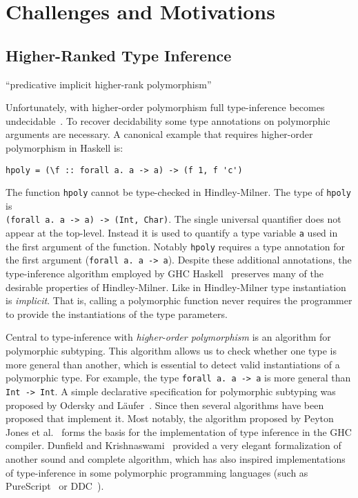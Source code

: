 \section{Challenges and Motivations}

\subsection{Higher-Ranked Type Inference}

``predicative implicit higher-rank polymorphism''

Unfortunately, with higher-order polymorphism full type-inference becomes
undecidable~\cite{wells1999typability}. To recover decidability some type annotations 
on polymorphic arguments
are necessary. 
A canonical example that requires higher-order polymorphism in Haskell is:
\begin{verbatim}
hpoly = (\f :: forall a. a -> a) -> (f 1, f 'c')
\end{verbatim}
The function \verb|hpoly| cannot be
type-checked in Hindley-Milner.  The type of \verb|hpoly| is \\
\verb|(forall a. a -> a) -> (Int, Char)|. The single universal quantifier
does not appear at the top-level. Instead it is used to quantify a
type variable \verb|a| used in the first argument of the
function.
Notably \verb|hpoly| requires a type annotation for the first
argument (\verb|forall a. a -> a|). 
Despite these additional annotations,
the type-inference algorithm employed by GHC Haskell~\cite{jones2007practical} preserves 
many of the desirable properties of Hindley-Milner. 
Like in Hindley-Milner type instantiation is \emph{implicit}. That is,
calling a polymorphic function never requires the programmer to 
provide the instantiations of the type parameters.

Central to type-inference with \emph{higher-order polymorphism} is an
algorithm for polymorphic subtyping. 
This algorithm
allows us to check whether one type is more general than another,
which is essential to detect valid instantiations of a polymorphic
type. For example, the type \verb|forall a. a -> a| is more
general than \verb|Int -> Int|. 
A simple declarative specification for polymorphic subtyping
was proposed by Odersky and L\"aufer~\cite{odersky1996putting}. Since then several
algorithms have been proposed that implement it. Most
notably, the algorithm proposed by Peyton Jones et al.~\cite{jones2007practical} forms the basis
for the implementation of type inference in the GHC compiler. 
Dunfield and Krishnaswami~\cite{dunfield2013complete} provided a very elegant
formalization of another sound and complete algorithm, which has 
also inspired implementations of type-inference in some polymorphic 
programming languages (such as PureScript~\cite{PureScript} or DDC~\cite{Disciple}).

